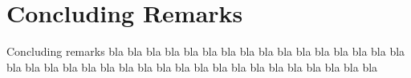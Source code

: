 
\section{Concluding Remarks}

Concluding remarks bla bla bla bla bla bla bla bla bla bla bla bla bla bla bla bla bla bla bla bla bla bla bla bla bla bla bla bla bla bla bla bla bla bla bla bla  

\label{sec:conclusions}
%
%
%
%

